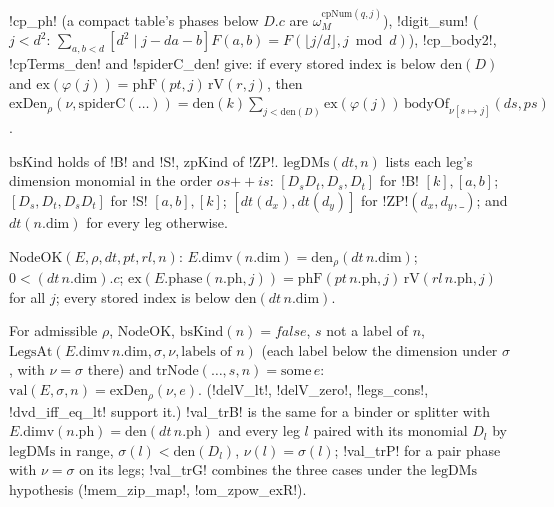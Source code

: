 \begin{definition}
\begin{itemize}
\end{itemize}
\lean!cp_ph! (a compact table's phases below $D.c$ are $\omega_M^{\mathrm{cpNum}(q,j)}$), \lean!digit_sum! ($j<d^2$: $\sum_{a,b<d}[d^2\mid j-da-b]F(a,b)=F(\lfloor j/d\rfloor,j\bmod d)$), \lean!cp_body2!, \lean!cpTerms_den! and \lean!spiderC_den! give: if every stored index is below $\mathrm{den}(D)$ and $\mathrm{ex}(\varphi(j))=\mathrm{phF}(\mathit{pt},j)\,\mathrm{rV}(r,j)$, then $\mathrm{exDen}_\rho(\nu,\mathrm{spiderC}(\ldots))=\mathrm{den}(k)\sum_{j<\mathrm{den}(D)}\mathrm{ex}(\varphi(j))\,\mathrm{bodyOf}_{\nu[s\mapsto j]}(ds,ps)$.
\end{definition}

\begin{definition}
$\mathrm{bsKind}$ holds of \lean!B! and \lean!S!, $\mathrm{zpKind}$ of \lean!ZP!. $\mathrm{legDMs}(\mathit{dt},n)$ lists each leg's dimension monomial in the order $os\mathbin{+\!\!+}is$: $[D_sD_t,D_s,D_t]$ for \lean!B! $[k],[a,b]$; $[D_s,D_t,D_sD_t]$ for \lean!S! $[a,b],[k]$; $[\mathit{dt}(d_x),\mathit{dt}(d_y)]$ for \lean!ZP!$(d_x,d_y,\_)$; and $\mathit{dt}(n.\mathrm{dim})$ for every leg otherwise.
\end{definition}

\begin{definition}
$\mathrm{NodeOK}(E,\rho,\mathit{dt},\mathit{pt},\mathit{rl},n)$: $E.\mathrm{dimv}(n.\mathrm{dim})=\mathrm{den}_\rho(\mathit{dt}\,n.\mathrm{dim})$; $0<(\mathit{dt}\,n.\mathrm{dim}).c$; $\mathrm{ex}(E.\mathrm{phase}(n.\mathrm{ph},j))=\mathrm{phF}(\mathit{pt}\,n.\mathrm{ph},j)\,\mathrm{rV}(\mathit{rl}\,n.\mathrm{ph},j)$ for all $j$; every stored index is below $\mathrm{den}(\mathit{dt}\,n.\mathrm{dim})$.
\end{definition}

\begin{theorem}
\begin{sloppypar}For admissible $\rho$, $\mathrm{NodeOK}$, $\mathrm{bsKind}(n)=\mathit{false}$, $s$ not a label of $n$, $\mathrm{LegsAt}(E.\mathrm{dimv}\,n.\mathrm{dim},\sigma,\nu,\text{labels of }n)$ (each label below the dimension under $\sigma$, with $\nu=\sigma$ there) and $\mathrm{trNode}(\ldots,s,n)=\mathrm{some}\,e$: $\mathrm{val}(E,\sigma,n)=\mathrm{exDen}_\rho(\nu,e)$. (\lean!delV_lt!, \lean!delV_zero!, \lean!legs_cons!, \lean!dvd_iff_eq_lt! support it.) \lean!val_trB! is the same for a binder or splitter with $E.\mathrm{dimv}(n.\mathrm{ph})=\mathrm{den}(\mathit{dt}\,n.\mathrm{ph})$ and every leg $l$ paired with its monomial $D_l$ by $\mathrm{legDMs}$ in range, $\sigma(l)<\mathrm{den}(D_l)$, $\nu(l)=\sigma(l)$; \lean!val_trP! for a pair phase with $\nu=\sigma$ on its legs; \lean!val_trG! combines the three cases under the $\mathrm{legDMs}$ hypothesis (\lean!mem_zip_map!, \lean!om_zpow_exR!).\end{sloppypar}
\end{theorem}

